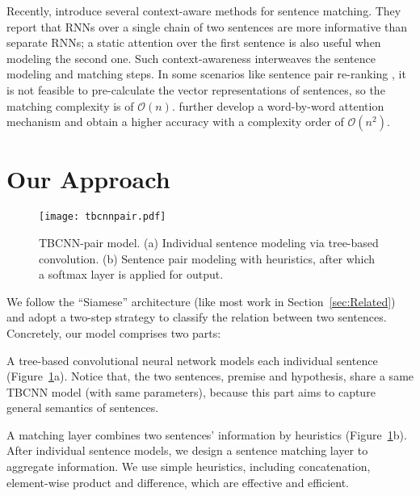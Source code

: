\documentclass[11pt]{article}
\begin{document}
Recently,  introduce several context-aware methods for sentence matching. They report that RNNs over a single chain of two sentences are more informative than separate RNNs; a static attention over the first sentence is also useful when modeling the second one. Such context-awareness interweaves the sentence modeling and matching steps. In some scenarios like sentence pair re-ranking \cite{sigir}, it is not feasible to pre-calculate the vector representations of sentences, so the matching complexity is of $\mathcal{O}(n)$.  further develop a word-by-word attention mechanism and obtain a higher accuracy with a complexity order of $\mathcal{O}(n^2)$.
 
\vspace{-.1cm}
\section{Our Approach}\label{sec:Approach}
\vspace{-.1cm}


\begin{figure}[!t]
\centering
\texttt{[image: tbcnnpair.pdf]}
\vspace{-.8cm plus 0cm minus 0cm}
\caption{TBCNN-pair model. (a) Individual sentence modeling via tree-based convolution. (b) Sentence pair modeling with heuristics, after which a softmax layer is applied for output.}\label{fig:model}

\end{figure}
We follow the ``Siamese'' architecture (like most work in Section~\ref{sec:Related}) and adopt a two-step strategy to classify the relation between two sentences. Concretely, our model comprises two parts:

\begin{compactitem}[\ \ $\bullet$]
\item A tree-based convolutional neural network models each individual sentence (Figure~\ref{fig:model}a). Notice that, the two sentences, premise and hypothesis, share a same TBCNN model (with same parameters), because this part aims to capture general semantics of sentences.

\item A matching layer combines two sentences' information by heuristics (Figure~\ref{fig:model}b). After individual sentence models, we design a sentence matching layer to aggregate information. We use simple heuristics, including concatenation, element-wise product and difference, which are effective and efficient.
\end{compactitem}
\end{document}
